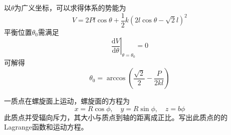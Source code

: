 \begin{solution}
以$\theta$为广义坐标，可以求得体系的势能为
\begin{equation*}
	V = 2Pl\cos \theta + \frac12 k\left(2l\cos \theta - \sqrt{2}l\right)^2 
\end{equation*}
平衡位置$\theta_0$需满足
\begin{equation*}
	\left.\frac{\mathrm{d} V}{\mathrm{d} \theta} \right|_{\theta=\theta_0} = 0
\end{equation*}
可解得
\begin{equation*}
	\theta_0 = \arccos\left(\frac{\sqrt{2}}{2} - \frac{P}{2kl}\right)
\end{equation*}
\end{solution}

\begin{question}[66页2.24]
一质点在螺旋面上运动，螺旋面的方程为
\begin{equation*}
	x = R\cos \phi,\quad y = R\sin \phi,\quad z = b\phi
\end{equation*}
此质点并受辐向斥力，其大小与质点到轴的距离成正比。写出此质点的的Lagrange函数和运动方程。
\end{question}
